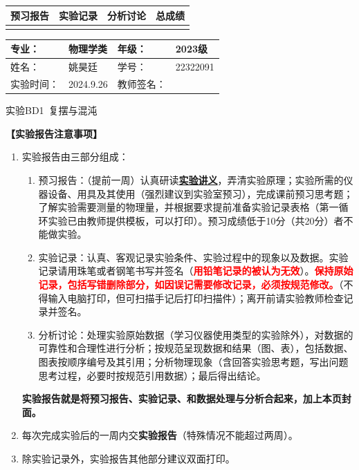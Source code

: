 \documentclass[dvipsnames, svgnames,a4paper,11pt]{article}
\begin{document}
\begin{table}
	\renewcommand\arraystretch{1.7}
	\begin{tabularx}{\textwidth}{
		|X|X|X|X
		|X|X|X|X|}
	\hline
	\multicolumn{2}{|c|}{预习报告}&\multicolumn{2}{|c|}{实验记录}&\multicolumn{2}{|c|}{分析讨论}&\multicolumn{2}{|c|}{总成绩}\\
	\hline
	 & &  & &  & &  & \\
	\hline
	\end{tabularx}
\end{table}


\begin{table}
	\renewcommand\arraystretch{1.7}
	\begin{tabularx}{\textwidth}{|X|X|X|X|}
	\hline
	专业：& 物理学类 &年级：& 2023级\\
	\hline
	姓名：& 姚昊廷  & 学号：&22322091\\
	\hline
	实验时间：& 2024.9.26& 教师签名：& \\
	\hline
	\end{tabularx}
\end{table}

\begin{center}
	\LARGE 实验BD1\ 复摆与混沌
\end{center}

\textbf{【实验报告注意事项】}
\begin{enumerate}
	\item 实验报告由三部分组成：
	\begin{enumerate}
		\item 预习报告：（提前一周）认真研读\underline{\textbf{实验讲义}}，弄清实验原理；实验所需的仪器设备、用具及其使用（强烈建议到实验室预习），完成课前预习思考题；了解实验需要测量的物理量，并根据要求提前准备实验记录表格（第一循环实验已由教师提供模板，可以打印）。预习成绩低于10分（共20分）者不能做实验。
	    \item 实验记录：认真、客观记录实验条件、实验过程中的现象以及数据。实验记录请用珠笔或者钢笔书写并签名（\textcolor{red}{\textbf{用铅笔记录的被认为无效}}）。\textcolor{red}{\textbf{保持原始记录，包括写错删除部分，如因误记需要修改记录，必须按规范修改。}}（不得输入电脑打印，但可扫描手记后打印扫描件）；离开前请实验教师检查记录并签名。
	    \item 分析讨论：处理实验原始数据（学习仪器使用类型的实验除外），对数据的可靠性和合理性进行分析；按规范呈现数据和结果（图、表），包括数据、图表按顺序编号及其引用；分析物理现象（含回答实验思考题，写出问题思考过程，必要时按规范引用数据）；最后得出结论。
	\end{enumerate}
	\textbf{实验报告就是将预习报告、实验记录、和数据处理与分析合起来，加上本页封面。}
	\item 每次完成实验后的一周内交\textbf{实验报告}（特殊情况不能超过两周）。
	\item 除实验记录外，实验报告其他部分建议双面打印。
\end{enumerate}
\end{document}
